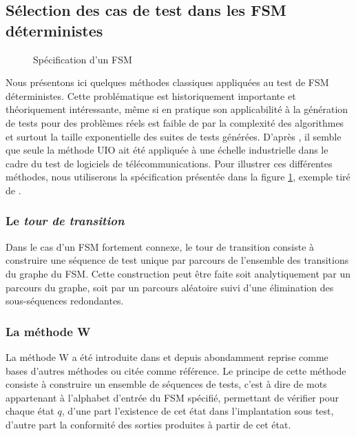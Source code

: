 \subsection{S\'election des cas de test dans les \textsf{FSM} d\'eterministes}

\begin{figure}
\caption{Sp\'ecification  d'un \textsf{FSM}}
\label{fig-sample-fsm}
\end{figure}

Nous pr\'esentons ici quelques m\'ethodes classiques appliqu\'ees
au test de \textsf{FSM} d\'eterministes. Cette probl\'ematique est
historiquement importante et th\'eoriquement int\'eressante, m\^eme
si en pratique son applicabilit\'e \`a la g\'en\'eration de tests
pour des probl\`emes r\'eels est faible de par la complexit\'e des
algorithmes et surtout la taille exponentielle des suites de tests
g\'en\'er\'ees. D'apr\`es \cite{lai-prototest-survey}, il semble
que seule la m\'ethode \textsf{UIO} ait \'et\'e appliqu\'ee \`a
une \'echelle industrielle dans le cadre du test de logiciels  de
t\'el\'ecommunications. 
Pour illustrer ces diff\'erentes m\'ethodes, nous utiliserons
la sp\'ecification pr\'esent\'ee dans la figure
\ref{fig-sample-fsm}, exemple tir\'e de \cite{sidhu-study-fsmtest}.

\subsubsection{Le \emph{tour de transition}}

Dans le cas d'un \textsf{FSM} fortement connexe, le tour de transition consiste
\`a construire une s\'equence de test unique par parcours de
l'ensemble des transitions du graphe du \textsf{FSM}. Cette construction peut
\^etre faite soit analytiquement par un parcours du graphe, soit par
un parcours al\'eatoire suivi d'une \'elimination des
sous-s\'equences redondantes. 

\subsubsection{La m\'ethode \textsf{W}}
\label{sec:la-methode-w}

La m\'ethode \textsf{W} a \'et\'e introduite dans \cite{chow-w-method} et
depuis abondamment reprise comme bases d'autres m\'ethodes ou
cit\'ee comme r\'ef\'erence. Le
principe de cette m\'ethode consiste \`a construire un ensemble de
s\'equences de tests, c'est \`a dire de mots appartenant \`a
l'alphabet d'entr\'ee  du \textsf{FSM} sp\'ecifi\'e, permettant de
v\'erifier pour chaque \'etat $q$, d'une part l'existence de cet
\'etat dans l'implantation sous test, d'autre part la conformit\'e
des sorties produites \`a partir de cet \'etat.

